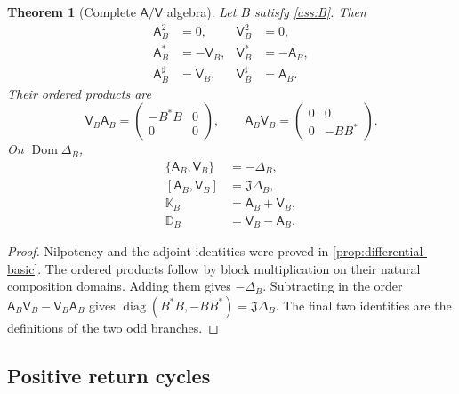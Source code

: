 \documentclass[11pt,reqno]{scrartcl}
\newcommand{\fundJ}{\mathfrak J}
\newcommand{\Aop}{\mathsf A}
\newcommand{\Vop}{\mathsf V}
\newcommand{\DB}{\mathbb D}
\newcommand{\KB}{\mathbb K}
\newcommand{\DeltaB}{\Delta}
\DeclareMathOperator{\Dom}{Dom}
\DeclareMathOperator{\diag}{diag}
\theoremstyle{plain}
\newtheorem{theorem}{Theorem}[section]
\theoremstyle{definition}
\theoremstyle{remark}
\begin{document}
\begin{theorem}[Complete \(\Aop/\Vop\) algebra]
\label{thm:AV-algebra}
Let \(B\) satisfy \cref{ass:B}. Then
\begin{align}
  \Aop_B^2&=0,
  &\Vop_B^2&=0,
  \label{eq:AV-nilpotent}\\
  \Aop_B^*&=-\Vop_B,
  &\Vop_B^*&=-\Aop_B,
  \label{eq:AV-star}\\
  \Aop_B^\sharp&=\Vop_B,
  &\Vop_B^\sharp&=\Aop_B.
  \label{eq:AV-ddagger}
\end{align}
Their ordered products are
\begin{equation}
  \Vop_B\Aop_B
  =
  \begin{pmatrix}
    -B^*B&0\\
    0&0
  \end{pmatrix},
  \qquad
  \Aop_B\Vop_B
  =
  \begin{pmatrix}
    0&0\\
    0&-BB^*
  \end{pmatrix}.
  \label{eq:ordered-products}
\end{equation}
On \(\Dom\DeltaB_B\),
\begin{align}
  \{\Aop_B,\Vop_B\}&=-\DeltaB_B,
  \label{eq:anticommutator}\\
  [\Aop_B,\Vop_B]&=\fundJ\DeltaB_B,
  \label{eq:commutator}\\
  \KB_B&=\Aop_B+\Vop_B,
  \label{eq:K-sum}\\
  \DB_B&=\Vop_B-\Aop_B.
  \label{eq:D-difference}
\end{align}
\end{theorem}

\begin{proof}
Nilpotency and the adjoint identities were proved in
\cref{prop:differential-basic}. The ordered products follow by block
multiplication on their natural composition domains. Adding them gives
\(-\DeltaB_B\). Subtracting in the order
\(\Aop_B\Vop_B-\Vop_B\Aop_B\) gives
\(\diag(B^*B,-BB^*)=\fundJ\DeltaB_B\). The final two identities are the
definitions of the two odd branches.
\end{proof}

\subsection{Positive return cycles}
\end{document}
